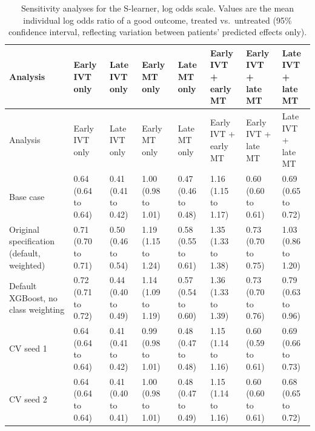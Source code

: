 \begin{landscape}
{\begin{longtable}[]{@{}llllllll@{}}
\caption{Sensitivity analyses for the S-learner, log odds scale. Values are the mean individual log odds ratio of a good outcome, treated vs.\ untreated (95\% confidence interval, reflecting variation between patients' predicted effects only).}
\label{tab:sens_sl_logodds}\\
\toprule
Analysis & \makecell[l]{Early IVT\\only} & \makecell[l]{Late IVT\\only} & \makecell[l]{Early MT\\only} & \makecell[l]{Late MT\\only} & \makecell[l]{Early IVT +\\early MT} & \makecell[l]{Early IVT +\\late MT} & \makecell[l]{Late IVT +\\late MT} \\
\midrule
\endfirsthead
\toprule
Analysis & \makecell[l]{Early IVT\\only} & \makecell[l]{Late IVT\\only} & \makecell[l]{Early MT\\only} & \makecell[l]{Late MT\\only} & \makecell[l]{Early IVT +\\early MT} & \makecell[l]{Early IVT +\\late MT} & \makecell[l]{Late IVT +\\late MT} \\
\midrule
\endhead
\bottomrule
\endlastfoot
Base case & 0.64 (0.64 to 0.64) & 0.41 (0.41 to 0.42) & 1.00 (0.98 to 1.01) & 0.47 (0.46 to 0.48) & 1.16 (1.15 to 1.17) & 0.60 (0.60 to 0.61) & 0.69 (0.65 to 0.72) \\
Original specification (default, weighted) & 0.71 (0.70 to 0.71) & 0.50 (0.46 to 0.54) & 1.19 (1.15 to 1.24) & 0.58 (0.55 to 0.61) & 1.35 (1.33 to 1.38) & 0.73 (0.70 to 0.75) & 1.03 (0.86 to 1.20) \\
Default XGBoost, no class weighting & 0.72 (0.71 to 0.72) & 0.44 (0.40 to 0.49) & 1.14 (1.09 to 1.19) & 0.57 (0.54 to 0.60) & 1.36 (1.33 to 1.39) & 0.73 (0.70 to 0.76) & 0.79 (0.63 to 0.96) \\
CV seed 1 & 0.64 (0.64 to 0.64) & 0.41 (0.41 to 0.42) & 0.99 (0.98 to 1.01) & 0.48 (0.47 to 0.48) & 1.15 (1.14 to 1.16) & 0.60 (0.59 to 0.61) & 0.69 (0.66 to 0.73) \\
CV seed 2 & 0.64 (0.64 to 0.64) & 0.41 (0.40 to 0.41) & 1.00 (0.98 to 1.01) & 0.48 (0.47 to 0.49) & 1.15 (1.14 to 1.16) & 0.60 (0.60 to 0.61) & 0.68 (0.65 to 0.72) \\

\end{longtable}}
\end{landscape}
